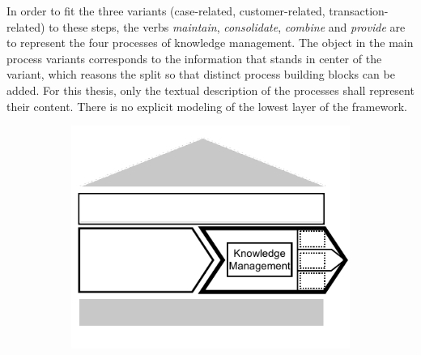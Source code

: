 In order to fit the three variants (case-related, customer-related, transaction-related) to these steps, the verbs \textit{maintain}, \textit{consolidate}, \textit{combine} and \textit{provide} are to represent the four processes of knowledge management. The object in the main process variants corresponds to the information that stands in center of the variant, which reasons the split so that distinct process building blocks can be added. 
For this thesis, only the textual description of the processes shall represent their content. There is no explicit modeling of the lowest layer of the framework. 

\begin{figure}[caption={Knowledge Management main process variants}, label={fig:knowledge}]
	\begin{subfigure}[b]{.6\textwidth}
		\begin{center}
			\includegraphics{figures/processes/knowledgemanagement.pdf}
		\end{center}
	\end{subfigure}

	\begin{subfigure}[b]{.32\textwidth}
		\begin{center}
\end{center}
\end{subfigure}
\end{figure}
